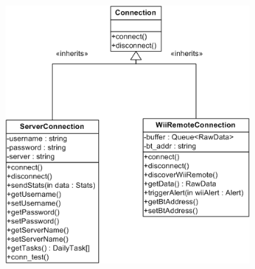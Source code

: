 \documentclass{article}
\begin{document}
\begin{center}
\includegraphics[width=3.62in,height=3.83in]{PDA_Server_Connection.png}
\end{center}
\end{document}
